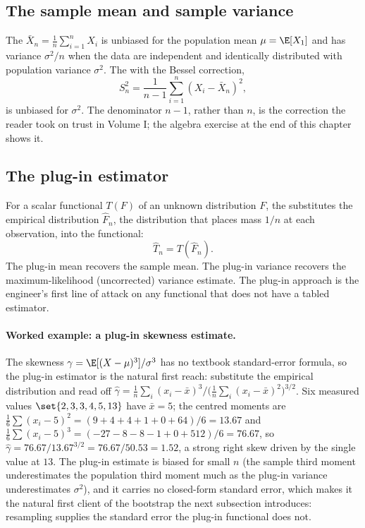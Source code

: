 

\subsection{The sample mean and sample variance}

The  $\bar{X}_{n} = \frac{1}{n}\sum_{i=1}^{n}
X_{i}$ is unbiased for the population mean $\mu = \E[X_{1}]$ and
has variance $\sigma^{2}/n$ when the data are independent and
identically distributed with population variance $\sigma^{2}$.
The  with the Bessel correction,
\[
S_{n}^{2} = \frac{1}{n-1}\sum_{i=1}^{n} (X_{i} - \bar{X}_{n})^{2},
\]
is unbiased for $\sigma^{2}$. The denominator $n-1$, rather than
$n$, is the correction the reader took on trust in Volume I; the
algebra exercise at the end of this chapter shows it.

\subsection{The plug-in estimator}

For a scalar functional $T(F)$ of an unknown distribution $F$, the
 substitutes the empirical distribution
$\hat{F}_{n}$, the distribution that places mass $1/n$ at each
observation, into the functional:
\[
\hat{T}_{n} = T(\hat{F}_{n}).
\]
The plug-in mean recovers the sample mean. The plug-in variance
recovers the maximum-likelihood (uncorrected) variance estimate.
The plug-in approach is the engineer's first line of attack on any
functional that does not have a tabled estimator.

\paragraph{Worked example: a plug-in skewness estimate.} The skewness
$\gamma = \E[(X - \mu)^{3}]/\sigma^{3}$ has no textbook standard-error
formula, so the plug-in estimator is the natural first reach:
substitute the empirical distribution and read off
$\hat{\gamma} = \frac{1}{n}\sum_{i}(x_{i} - \bar{x})^{3} /
\bigl(\frac{1}{n}\sum_{i}(x_{i} - \bar{x})^{2}\bigr)^{3/2}$. Six
measured values $\set{2, 3, 3, 4, 5, 13}$ have $\bar{x} = 5$; the
centred moments are $\frac{1}{6}\sum(x_{i}-5)^{2} = (9 + 4 + 4 + 1 + 0
+ 64)/6 = 13.67$ and $\frac{1}{6}\sum(x_{i}-5)^{3} = (-27 - 8 - 8 - 1
+ 0 + 512)/6 = 76.67$, so $\hat{\gamma} = 76.67/13.67^{3/2} =
76.67/50.53 = 1.52$, a strong right skew driven by the single value at
$13$. The plug-in estimate is biased for small $n$ (the sample third
moment underestimates the population third moment much as the plug-in
variance underestimates $\sigma^{2}$), and it carries no closed-form
standard error, which makes it the natural first client of the
bootstrap the next subsection introduces: resampling supplies the
standard error the plug-in functional does not.

